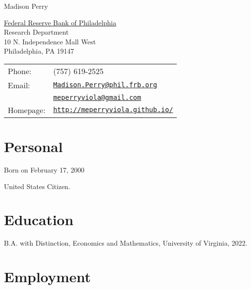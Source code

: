 \documentclass[letterpaper]{article}
\def\name{Madison Perry}
\renewenvironment{itemize}{
	\begin{list}{}{
			\setlength{\leftmargin}{1.5em}
		}
	}{
	\end{list}
}
\begin{document}
	
	{\huge \name}
	
	
	\vspace{0.25in}
	
	\begin{minipage}{0.45\linewidth}
		\href{https://www.philadelphiafed.org/}{Federal Reserve Bank of Philadelphia} \\
		Research Department \\
		10 N. Independence Mall West \\
		Philadelphia, PA 19147
	\end{minipage}
	\begin{minipage}{0.45\linewidth}
		\begin{tabular}{ll}
			Phone: & (757) 619-2525 \\
			Email: & \href{mailto:Madison.Perry@phil.frb.org}{\tt Madison.Perry@phil.frb.org} \\
				&  \href{mailto:meperryviola@gmail.com}{\tt meperryviola@gmail.com} \\
			Homepage: & \href{http://meperryviola.github.io/}{\tt http://meperryviola.github.io/} \\
		\end{tabular}
	\end{minipage}
	
	
	\section*{Personal}
	
	\begin{itemize}
		\item Born on February 17, 2000
		\item United States Citizen.
	\end{itemize}
	
	
	\section*{Education}
	
	\begin{itemize}
		\item B.A. with Distinction, Economics and Mathematics, University of Virginia, 2022.
		
	\end{itemize}
	
	
	\section*{Employment}
	
\end{document}
